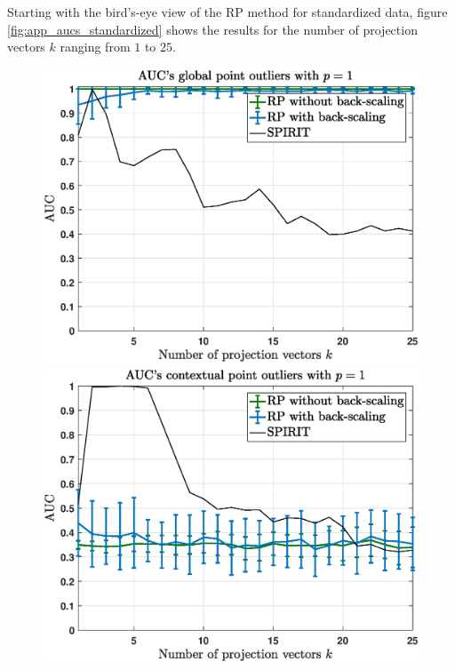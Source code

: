 Starting with the bird's-eye view of the RP method for standardized data, figure \ref{fig:app_aucs_standardized} shows the results for the number of projection vectors $k$ ranging from $1$ to $25$. 

\vspace{-0.25cm}
\hspace{-0.15cm}
\begin{figure}[h]
	\hspace{-0.2cm}
	\begin{minipage}{0.333\textwidth}
		\centering
		\includegraphics[scale=0.26]{analysis/AUCs_point_standardized}
	\end{minipage}
	\begin{minipage}{0.333\textwidth}
		\centering
		\includegraphics[scale=0.26]{analysis/AUCs_contextual_standardized}

\end{minipage}
\end{figure}
